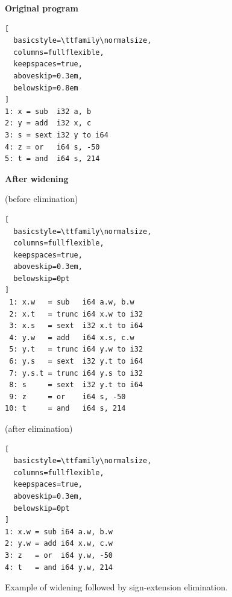 \begin{figure}[H]
\centering

\begin{minipage}{1\linewidth}

\textbf{Original program}

\begin{lstlisting}[
  basicstyle=\ttfamily\normalsize,
  columns=fullflexible,
  keepspaces=true,
  aboveskip=0.3em,
  belowskip=0.8em
]
1: x = sub  i32 a, b
2: y = add  i32 x, c
3: s = sext i32 y to i64
4: z = or   i64 s, -50
5: t = and  i64 s, 214
\end{lstlisting}

\textbf{After widening}

\medskip

\noindent
\begin{minipage}[t]{0.58\linewidth}
\vspace{-0.4cm}
\textnormal{(before elimination)}

\begin{lstlisting}[
  basicstyle=\ttfamily\normalsize,
  columns=fullflexible,
  keepspaces=true,
  aboveskip=0.3em,
  belowskip=0pt
]
 1: x.w   = sub   i64 a.w, b.w
 2: x.t   = trunc i64 x.w to i32
 3: x.s   = sext  i32 x.t to i64
 4: y.w   = add   i64 x.s, c.w
 5: y.t   = trunc i64 y.w to i32
 6: y.s   = sext  i32 y.t to i64
 7: y.s.t = trunc i64 y.s to i32
 8: s     = sext  i32 y.t to i64
 9: z     = or    i64 s, -50
10: t     = and   i64 s, 214
\end{lstlisting}
\end{minipage}%
\hspace{0cm}
\begin{minipage}[t]{0.36\linewidth}
\vspace{-0.4cm}
\textnormal{(after elimination)}

\begin{lstlisting}[
  basicstyle=\ttfamily\normalsize,
  columns=fullflexible,
  keepspaces=true,
  aboveskip=0.3em,
  belowskip=0pt
]
1: x.w = sub i64 a.w, b.w
2: y.w = add i64 x.w, c.w
3: z   = or  i64 y.w, -50
4: t   = and i64 y.w, 214
\end{lstlisting}
\end{minipage}

\end{minipage}

\vspace{1.2em}

\captionsetup{
  font=small,
  justification=centering,
  singlelinecheck=false,
  skip=0pt
}
\caption{Example of widening followed by sign-extension elimination.}
\label{fig:figure3}

\end{figure}